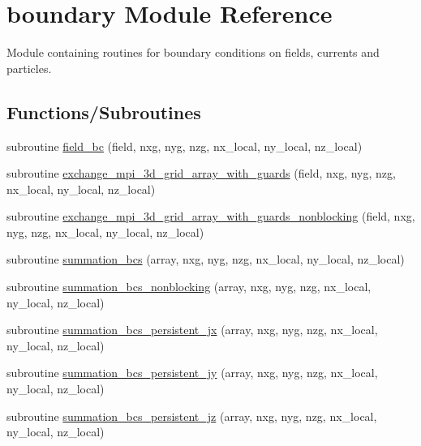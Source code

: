 \hypertarget{namespaceboundary}{}\section{boundary Module Reference}
\label{namespaceboundary}


Module containing routines for boundary conditions on fields, currents and particles.  


\subsection*{Functions/\+Subroutines}
\begin{DoxyCompactItemize}
\item 
subroutine \hyperlink{namespaceboundary_aaf2c39f38c9f0330fd2501f49ef34b7d}{field\+\_\+bc} (field, nxg, nyg, nzg, nx\+\_\+local, ny\+\_\+local, nz\+\_\+local)
\item 
subroutine \hyperlink{namespaceboundary_a7fcd1d8e118d647057f0523af107674e}{exchange\+\_\+mpi\+\_\+3d\+\_\+grid\+\_\+array\+\_\+with\+\_\+guards} (field, nxg, nyg, nzg,                                               nx\+\_\+local, ny\+\_\+local, nz\+\_\+local)
\item 
subroutine \hyperlink{namespaceboundary_a4e895aead34d40e905893ad3a0ee3d32}{exchange\+\_\+mpi\+\_\+3d\+\_\+grid\+\_\+array\+\_\+with\+\_\+guards\+\_\+nonblocking} (field, nxg, nyg, nzg,                                               nx\+\_\+local, ny\+\_\+local, nz\+\_\+local)
\item 
subroutine \hyperlink{namespaceboundary_ad298755064359a32a3e7d89b376329cf}{summation\+\_\+bcs} (array, nxg, nyg, nzg, nx\+\_\+local, ny\+\_\+local, nz\+\_\+local)
\item 
subroutine \hyperlink{namespaceboundary_a1ad86bf436bc91d3210fdf0f6d86ab1f}{summation\+\_\+bcs\+\_\+nonblocking} (array, nxg, nyg, nzg, nx\+\_\+local, ny\+\_\+local, nz\+\_\+local)
\item 
subroutine \hyperlink{namespaceboundary_ac7114eb91bced14ba975f1467fb2db08}{summation\+\_\+bcs\+\_\+persistent\+\_\+jx} (array, nxg, nyg, nzg, nx\+\_\+local, ny\+\_\+local, nz\+\_\+local)
\item 
subroutine \hyperlink{namespaceboundary_ac7a1a01d802cba6dd53260db0cb76a93}{summation\+\_\+bcs\+\_\+persistent\+\_\+jy} (array, nxg, nyg, nzg, nx\+\_\+local, ny\+\_\+local, nz\+\_\+local)
\item 
subroutine \hyperlink{namespaceboundary_ad2325e9a68255f71d1cafcee47b1ff9a}{summation\+\_\+bcs\+\_\+persistent\+\_\+jz} (array, nxg, nyg, nzg, nx\+\_\+local, ny\+\_\+local, nz\+\_\+local)

\end{DoxyCompactItemize}
